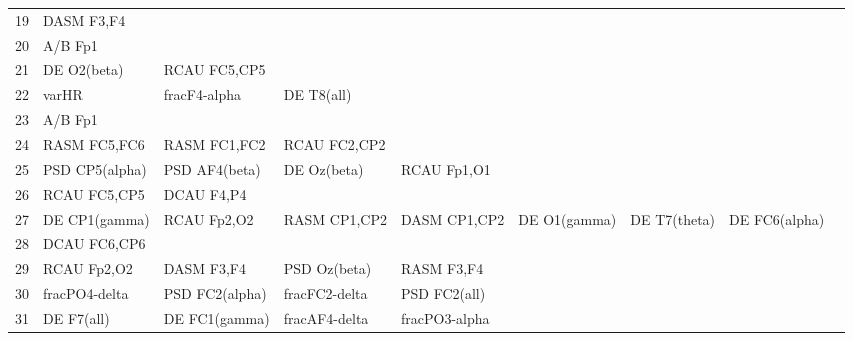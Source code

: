 \begin{landscape}
\begin{table}[]
\begin{tabular}{l|llllllll}
19                 & DASM F3,F4           &                         &                      &                    &                       &                      &                 &                 \\
20                 & A/B Fp1              &                         &                      &                    &                       &                      &                 &                 \\
21                 & DE O2(beta)          & RCAU FC5,CP5            &                      &                    &                       &                      &                 &                 \\
22                 & varHR                & fracF4-alpha            & DE T8(all)           &                    &                       &                      &                 &                 \\
23                 & A/B Fp1              &                         &                      &                    &                       &                      &                 &                 \\
24                 & RASM FC5,FC6         & RASM FC1,FC2            & RCAU FC2,CP2         &                    &                       &                      &                 &                 \\
25                 & PSD CP5(alpha)       & PSD AF4(beta)           & DE Oz(beta)          & RCAU Fp1,O1        &                       &                      &                 &                 \\
26                 & RCAU FC5,CP5         & DCAU F4,P4              &                      &                    &                       &                      &                 &                 \\
27                 & DE CP1(gamma)        & RCAU Fp2,O2             & RASM CP1,CP2         & DASM CP1,CP2       & DE O1(gamma)          & DE T7(theta)         & DE FC6(alpha)   &                 \\
28                 & DCAU FC6,CP6         &                         &                      &                    &                       &                      &                 &                 \\
29                 & RCAU Fp2,O2          & DASM F3,F4              & PSD Oz(beta)         & RASM F3,F4         &                       &                      &                 &                 \\
30                 & fracPO4-delta        & PSD FC2(alpha)          & fracFC2-delta        & PSD FC2(all)       &                       &                      &                 &                 \\
31                 & DE F7(all)           & DE FC1(gamma)           & fracAF4-delta        & fracPO3-alpha      &                       &                      &                 &                 \\
\end{tabular}
\end{table}
\end{landscape}
